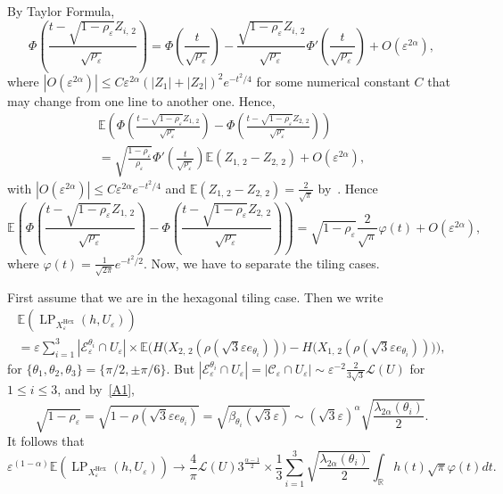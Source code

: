 \documentclass[10pt]{amsart}
\theoremstyle{definition}\newtheorem{defi}[theo]{Definition}\newtheorem{rema}[theo]{Remark}\newtheorem{exam}[theo]{Example}\newtheorem{exem}[theo]{Example}\newtheorem{nota}[theo]{Notation}
\newcommand{\R}{\mathbb{R}}
\newcommand{\E}{\mathbb{E}}
\newcommand{\eps}{\varepsilon}
\DeclareMathOperator{\LP}{LP}
\DeclareMathOperator{\Hex}{Hex}
\newcommand{\calL}{\mathcal{L}}
\newcommand{\calC}{\mathcal{C}}
\newcommand{\calE}{\mathcal{E}}
\begin{document}
By Taylor Formula,
\[
\Phi\left(\frac{t-\sqrt{1-\rho_\eps}Z_{i,\,2}}{\sqrt{\rho_\eps}}\right)
=\Phi\left(\frac{t}{\sqrt{\rho_\eps}}\right)-\frac{\sqrt{1-\rho_\eps}Z_{i,\,2}}{\sqrt{\rho_\eps}}\Phi'\left(\frac{t}{\sqrt{\rho_\eps}}\right)+O\left(\eps^{2\alpha}\right),
\]
where $|O(\eps^{2\alpha})|\le C\eps^{2\alpha}(|Z_{1}|+|Z_2|)^2e^{-t^2/4}$ for some numerical constant $C$ that may change from one line to another one. Hence,
\begin{multline*}
\E\left(\Phi\left(\frac{t-\sqrt{1-\rho_\eps}Z_{1,\,2}}{\sqrt{\rho_\eps}}\right)-\Phi\left(\frac{t-\sqrt{1-\rho_\eps}Z_{2,\,2}}{\sqrt{\rho_\eps}}\right)\right)\\
=\sqrt{\frac{1-\rho_\eps}{\rho_\eps}}\Phi'\left(\frac{t}{\sqrt{\rho_\eps}}\right)\E\left(Z_{1,\,2}-Z_{2,\,2}\right)+O\left(\eps^{2\alpha}\right),
\end{multline*}
with $|O(\eps^{2\alpha})|\le C\eps^{2\alpha}e^{-t^2/4}$ and $\E(Z_{1,\,2}-Z_{2,\,2})=\tfrac{2}{\sqrt{\pi}}$ by~\cite[p.~96]{Nevzorov}. Hence
\[
\E\left(\Phi\left(\frac{t-\sqrt{1-\rho_\eps}Z_{1,\,2}}{\sqrt{\rho_\eps}}\right)-\Phi\left(\frac{t-\sqrt{1-\rho_\eps}Z_{2,\,2}}{\sqrt{\rho_\eps}}\right)\right)
=\sqrt{1-\rho_\eps}\frac{2}{\sqrt{\pi}}\varphi(t)+O\left(\eps^{2\alpha}\right),
\]
where $\varphi(t)=\tfrac{1}{\sqrt{2\pi}}e^{-t^2/2}$. Now, we have to separate the tiling cases.


First assume that we are in the hexagonal tiling case. Then we write
\begin{multline*}
\E\left(\LP_{X_\eps^{\Hex}}(h,U_\eps)\right)\\
=\eps\sum_{i=1}^3|\calE_\eps^{\theta_i}\cap
U_\eps|\times
\E\bigg(H\Big(X_{2,\,2}\left(\rho\left(\sqrt{3}\eps e_{\theta_i}\right)\right)\Big) - H\Big(X_{1,\,2}\left(\rho\left(\sqrt{3}\eps e_{\theta_i}\right)\right)\Big)\bigg),
\end{multline*}
for $\{\theta_1,\theta_2,\theta_3\}=\{\pi/2,\pm \pi/6\}$. But $|\calE_\eps^{\theta_i}\cap U_\eps|=|\calC_\eps\cap U_\eps|\sim \eps^{-2}\frac{2}{3\sqrt{3}}{\calL}(U)$ for $1\le i\le 3$, and by~\eqref{A1},
\[
\sqrt{1-\rho_\eps}=\sqrt{1-\rho\left(\sqrt{3}\eps e_{\theta_i}\right)}=\sqrt{\beta_{\theta_i}\left(\sqrt{3}\eps\right)}\sim \left(\sqrt{3}\eps\right)^\alpha\sqrt{\frac{\lambda_{{2\alpha}}(\theta_i)}{2}}.
\]
It follows that
\[
\eps^{(1-\alpha)}\E\left(\LP_{X_\eps^{\Hex}}(h,U_\eps)\right)\longrightarrow \frac{4}{{\pi}}{\calL}(U)
{3}^{\frac{\alpha-1}{2}}\times\frac{1}{3}\sum_{i=1}^3\sqrt{\frac{\lambda_{{2\alpha}}(\theta_i)}{2}}\int_\R h(t){\sqrt{\pi}}\varphi(t)dt.
\]
\end{document}
